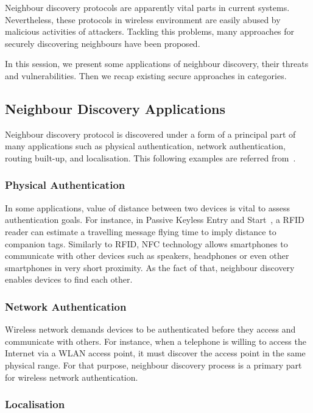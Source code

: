 Neighbour discovery protocols are apparently vital parts in current systems. Nevertheless, these protocols in wireless environment are easily abused by malicious activities of attackers. Tackling this problems, many approaches for securely discovering neighbours have been proposed. 

In this session, we present some applications of neighbour discovery, their threats and vulnerabilities. Then we recap existing secure approaches in categories.

\subsection{Neighbour Discovery Applications}

Neighbour discovery protocol is discovered under a form of a principal part of many applications such as physical authentication, network authentication, routing built-up, and localisation. This following examples are referred from~\cite{Marcinthesis}.

\subsubsection*{Physical Authentication}

In some applications, value of distance between two devices is vital to assess authentication goals. For instance, in Passive Keyless Entry and Start~\cite{waraksa1990passive}, a RFID reader can estimate a travelling message flying time to imply distance to companion tags. Similarly to RFID, NFC technology allows smartphones to communicate with other devices such as speakers, headphones or even other smartphones in very short proximity. As the fact of that, neighbour discovery enables devices to find each other. 

\subsubsection*{Network Authentication}
Wireless network demands devices to be authenticated before they access and communicate with others. For instance, when a telephone is willing to access the Internet via a WLAN access point, it must discover the access point in the same physical range. For that purpose, neighbour discovery process is a primary part for wireless network authentication. 

\subsubsection*{Localisation}

